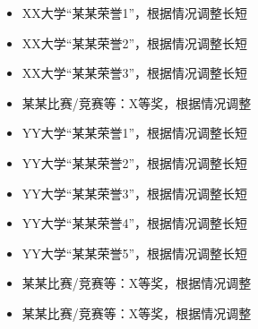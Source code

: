 \documentclass[10pt,a4paper,ragged2e,withhyper]{altacv}
\begin{document}
\begin{paracol}{2}
\begin{itemize}
	\item {\fontsize{9}{11} \selectfont XX大学“某某荣誉1”，根据情况调整长短}
	\item {\fontsize{9}{11} \selectfont XX大学“某某荣誉2”，根据情况调整长短}
	\item {\fontsize{9}{11} \selectfont XX大学“某某荣誉3”，根据情况调整长短}
	\item {\fontsize{9}{11} \selectfont 某某比赛/竞赛等：X等奖，根据情况调整}
\end{itemize}
\divider
\begin{itemize}
	\item {\fontsize{9}{11} \selectfont YY大学“某某荣誉1”，根据情况调整长短}
	\item {\fontsize{9}{11} \selectfont YY大学“某某荣誉2”，根据情况调整长短}
	\item {\fontsize{9}{11} \selectfont YY大学“某某荣誉3”，根据情况调整长短}
	\item {\fontsize{9}{11} \selectfont YY大学“某某荣誉4”，根据情况调整长短}
	\item {\fontsize{9}{11} \selectfont YY大学“某某荣誉5”，根据情况调整长短}
	\item {\fontsize{9}{11} \selectfont 某某比赛/竞赛等：X等奖，根据情况调整}
	\item {\fontsize{9}{11} \selectfont 某某比赛/竞赛等：X等奖}，根据情况调整
\end{itemize}


\\




\\
\\
\\
\\
\\



\medskip
{}


\end{paracol}
\end{document}
